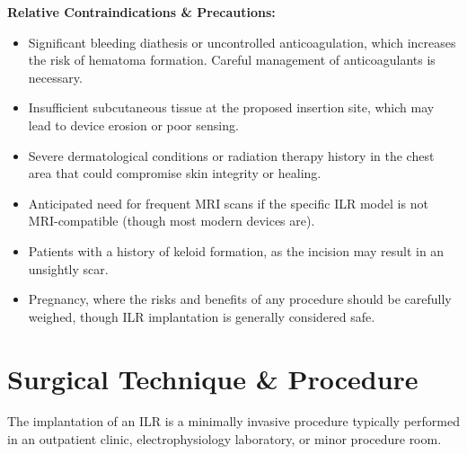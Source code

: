 \textbf{Relative Contraindications \& Precautions:}
\begin{itemize}
  \item Significant bleeding diathesis or uncontrolled anticoagulation, which increases the risk of hematoma formation. Careful management of anticoagulants is necessary.
  \item Insufficient subcutaneous tissue at the proposed insertion site, which may lead to device erosion or poor sensing.
  \item Severe dermatological conditions or radiation therapy history in the chest area that could compromise skin integrity or healing.
  \item Anticipated need for frequent MRI scans if the specific ILR model is not MRI-compatible (though most modern devices are).
  \item Patients with a history of keloid formation, as the incision may result in an unsightly scar.
  \item Pregnancy, where the risks and benefits of any procedure should be carefully weighed, though ILR implantation is generally considered safe.
\end{itemize}

\section*{Surgical Technique \& Procedure}
The implantation of an ILR is a minimally invasive procedure typically performed in an outpatient clinic, electrophysiology laboratory, or minor procedure room.

